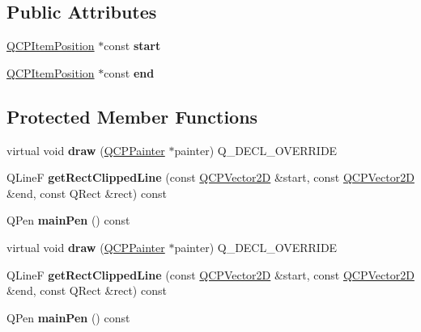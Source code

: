 \subsection*{Public Attributes}
\begin{DoxyCompactItemize}
\item 
\mbox{\label{class_q_c_p_item_line_a36e257617a76719388669c4a72cc11aa}} 
\hyperlink{class_q_c_p_item_position}{Q\+C\+P\+Item\+Position} $\ast$const {\bfseries start}
\item 
\mbox{\label{class_q_c_p_item_line_a5116ddd9ceb5332e5bb53ff492501dc2}} 
\hyperlink{class_q_c_p_item_position}{Q\+C\+P\+Item\+Position} $\ast$const {\bfseries end}
\end{DoxyCompactItemize}
\subsection*{Protected Member Functions}
\begin{DoxyCompactItemize}
\item 
\mbox{\label{class_q_c_p_item_line_ae184140b61b2ef5b8edde76304447200}} 
virtual void {\bfseries draw} (\hyperlink{class_q_c_p_painter}{Q\+C\+P\+Painter} $\ast$painter) Q\+\_\+\+D\+E\+C\+L\+\_\+\+O\+V\+E\+R\+R\+I\+DE
\item 
\mbox{\label{class_q_c_p_item_line_a7b00a1d82be8b961461cc4039acd12a3}} 
Q\+LineF {\bfseries get\+Rect\+Clipped\+Line} (const \hyperlink{class_q_c_p_vector2_d}{Q\+C\+P\+Vector2D} \&start, const \hyperlink{class_q_c_p_vector2_d}{Q\+C\+P\+Vector2D} \&end, const Q\+Rect \&rect) const
\item 
\mbox{\label{class_q_c_p_item_line_af8b5370462515b279578d8b4a57bd3b4}} 
Q\+Pen {\bfseries main\+Pen} () const
\item 
\mbox{\label{class_q_c_p_item_line_a3aaf4e599727f71e6b96b4b36f82c939}} 
virtual void {\bfseries draw} (\hyperlink{class_q_c_p_painter}{Q\+C\+P\+Painter} $\ast$painter) Q\+\_\+\+D\+E\+C\+L\+\_\+\+O\+V\+E\+R\+R\+I\+DE
\item 
\mbox{\label{class_q_c_p_item_line_a7b00a1d82be8b961461cc4039acd12a3}} 
Q\+LineF {\bfseries get\+Rect\+Clipped\+Line} (const \hyperlink{class_q_c_p_vector2_d}{Q\+C\+P\+Vector2D} \&start, const \hyperlink{class_q_c_p_vector2_d}{Q\+C\+P\+Vector2D} \&end, const Q\+Rect \&rect) const
\item 
\mbox{\label{class_q_c_p_item_line_af8b5370462515b279578d8b4a57bd3b4}} 
Q\+Pen {\bfseries main\+Pen} () const
\end{DoxyCompactItemize}
